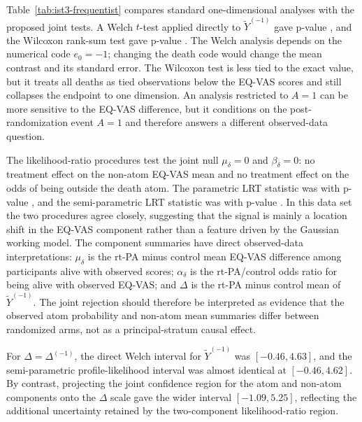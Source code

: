 \documentclass[11pt]{article}
\begin{document}
Table~\ref{tab:ist3-frequentist} compares standard one-dimensional analyses with the proposed joint tests. A Welch $t$-test applied directly to $\widetilde{Y}^{(-1)}$ gave p-value \ApplicationTTestP{}, and the Wilcoxon rank-sum test gave p-value \ApplicationWilcoxP{}. The Welch analysis depends on the numerical code $e_0=-1$; changing the death code would change the mean contrast and its standard error. The Wilcoxon test is less tied to the exact value, but it treats all deaths as tied observations below the EQ-VAS scores and still collapses the endpoint to one dimension. An analysis restricted to $A=1$ can be more sensitive to the EQ-VAS difference, but it conditions on the post-randomization event $A=1$ and therefore answers a different observed-data question.



The likelihood-ratio procedures test the joint null $\mu_\delta=0$ and $\beta_\delta=0$: no treatment effect on the non-atom EQ-VAS mean and no treatment effect on the odds of being outside the death atom. The parametric LRT statistic was \ApplicationLRTStatistic{} with p-value \ApplicationLRTP{}, and the semi-parametric LRT statistic was \ApplicationSPLRTStatistic{} with p-value \ApplicationSPLRTP{}. In this data set the two procedures agree closely, suggesting that the signal is mainly a location shift in the EQ-VAS component rather than a feature driven by the Gaussian working model. The component summaries have direct observed-data interpretations: $\mu_\delta$ is the rt-PA minus control mean EQ-VAS difference among participants alive with observed scores; $\alpha_\delta$ is the rt-PA/control odds ratio for being alive with observed EQ-VAS; and $\Delta$ is the rt-PA minus control mean of $\widetilde{Y}^{(-1)}$. The joint rejection should therefore be interpreted as evidence that the observed atom probability and non-atom mean summaries differ between randomized arms, not as a principal-stratum causal effect.

For $\Delta=\Delta^{(-1)}$, the direct Welch interval for $\widetilde{Y}^{(-1)}$ was $[-0.46, 4.63]$, and the semi-parametric profile-likelihood interval was almost identical at $[-0.46, 4.62]$. By contrast, projecting the joint confidence region for the atom and non-atom components onto the $\Delta$ scale gave the wider interval $[-1.09, 5.25]$, reflecting the additional uncertainty retained by the two-component likelihood-ratio region.
\end{document}
